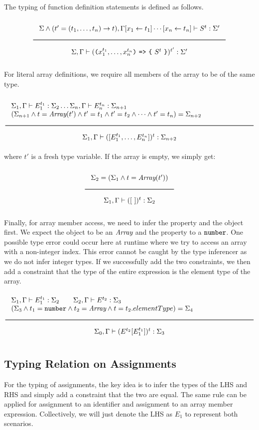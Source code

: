 The typing of function definition statements is defined as follows.

\noindent
\[
  \Rule{\Sigma \wedge (t' = (t_1, \ldots, t_n) \rightarrow t), \Gamma[x_1 \leftarrow t_1]\cdots
    [x_n \leftarrow t_n]
    \vdash S^{t} : \Sigma'}{
    \Sigma, \Gamma \vdash ( \Lp  x_1^{t_1}, \ldots, x_n^{t_n} \Rp\ \texttt{=>}\ \Lc\ S^{t}\ \Rc)^{t'} : \Sigma'}  
\]

For literal array definitions, we require all members of the array to be of the same type.

\[
\Rule{
	\begin{minipage}{120mm}
	$\Sigma_1, \Gamma \vdash E_1^{t_1} : \Sigma_2 \dots \Sigma_n, \Gamma \vdash E_n^{t_n} : \Sigma_{n+1}$ \\ 
	$(\Sigma_{n+1} \wedge t = \Array(t') \wedge t' = t_1 \wedge t' = t_2 \wedge \dots \wedge t' = t_n ) = \Sigma_{n+2}$ 
	\end{minipage}
}{
	\Sigma_1, \Gamma \vdash 
	( [E_1^{t_1}, \dots, E_n^{t_n}] )^{t} : \Sigma_{n+2}
}
\]
where $t'$ is a fresh type variable. If the array is empty, we simply get:

\[
\Rule{
	\Sigma_2 = (\Sigma_1 \wedge t = \Array(t'))
}{
	\Sigma_1, \Gamma \vdash 
	( [ \ ] )^{t} : \Sigma_{2}
}
\]

Finally, for array member access, we need to infer the property and the object first. We expect the object to be an 
$\textit{Array}$ and the property to a $\texttt{number}$. One possible type error could occur here at runtime where we try to access an 
array with a non-integer index. This error cannot be caught by the type inferencer as we do not infer integer types.
If we successfully add the two constraints, we then add a constraint that the type of the entire expression is the 
element type of the array.
\[
	\Rule{
		\begin{minipage}{120mm}
		$\Sigma_1, \Gamma \vdash E_1^{t_1}: \Sigma_2 \qquad \Sigma_2, \Gamma \vdash E^{t_2}: \Sigma_3$ \\
		$(\Sigma_3 \wedge t_1 = \Number \wedge t_2 = \Array \wedge t = t_2.elementType) = \Sigma_4$
		\end{minipage}			
	}{
	\Sigma_0, \Gamma \vdash (E^{t_2}[E_1^{t_1}])^t: \Sigma_3
}
\]

\subsection{Typing Relation on Assignments}
For the typing of assignments, the key idea is to infer the types of the LHS and RHS and simply add a constraint that
the two are equal. The same rule can be applied for assignment to an identifier and assignment to an array member
expression. Collectively, we will just denote the LHS as $E_1$ to represent both scenarios.

